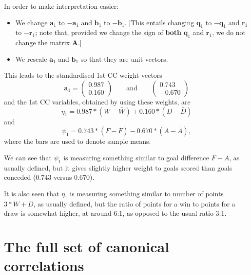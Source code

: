 \documentclass[]{book}
\providecommand{\tightlist}{%
  \setlength{\itemsep}{0pt}\setlength{\parskip}{0pt}}
\theoremstyle{definition}
\theoremstyle{definition}
\theoremstyle{definition}
\theoremstyle{remark}
\begin{document}
In order to make interpretation easier:

\begin{itemize}
\tightlist
\item
  We change \(\boldsymbol a_1\) to \(-\boldsymbol a_1\) and \(\boldsymbol b_1\) to \(-\boldsymbol b_1\). {[}This entails changing \(\boldsymbol q_1\) to \(-\boldsymbol q_1\) and \(\boldsymbol r_1\) to \(-\boldsymbol r_1\); note that, provided we change the sign of \textbf{both} \(\boldsymbol q_1\) and \(\boldsymbol r_1\), we do not change the matrix \(\boldsymbol A\).{]}
\item
  We rescale \(\boldsymbol a_1\) and \(\boldsymbol b_1\) so that they are unit vectors.
\end{itemize}

This leads to the standardised 1st CC weight vectors
\[
\boldsymbol a_1=\begin{pmatrix} 0.987\\0.160  \end{pmatrix} \qquad \text{and} \qquad
\begin{pmatrix} 0.743\\ -0.670\end{pmatrix}
\]
and the 1st CC variables, obtained by using these weights, are
\[
\eta_1 =0.987*(W-\bar{W}) +0.160*(D -\bar{D})
\]
and
\[
 \psi_1 = 0.743*(F-\bar{F}) - 0.670*(A-\bar{A}),
\]
where the bars are used to denote sample means.

We can see that \(\psi_1\) is measuring something similar to goal difference \(F-A\), as usually defined, but it gives slightly higher weight to goals scored than goals conceded (\(0.743\) versus \(0.670\)).

It is also seen that \(\eta_1\) is measuring something similar to number of points \(3*W+D\), as usually defined, but the ratio of points for a win to points for a draw is somewhat higher, at around 6:1, as opposed to the usual ratio 3:1.

\hypertarget{the-full-set-of-canonical-correlations}{%
\section{The full set of canonical correlations}\label{the-full-set-of-canonical-correlations}}
\end{document}
